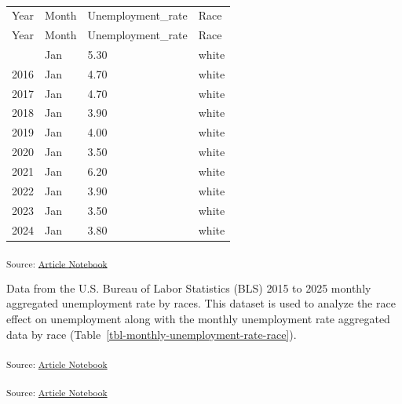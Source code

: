\documentclass[
]{agujournal2019}
\begin{document}
\begin{longtable}[]{@{}llll@{}}

\caption{\label{tbl-monthly-unemployment-rate-race}BLS 2015-2025 Monthly
Unemployment Rate By Race}

\tabularnewline

\caption{}\label{T_c9f29}\tabularnewline
\toprule\noalign{}
Year & Month & Unemployment\_rate & Race \\
\midrule\noalign{}
\endfirsthead
\toprule\noalign{}
Year & Month & Unemployment\_rate & Race \\
\midrule\noalign{}
\endhead
\bottomrule\noalign{}
\endlastfoot
2015 & Jan & 5.30 & white \\
2016 & Jan & 4.70 & white \\
2017 & Jan & 4.70 & white \\
2018 & Jan & 3.90 & white \\
2019 & Jan & 4.00 & white \\
2020 & Jan & 3.50 & white \\
2021 & Jan & 6.20 & white \\
2022 & Jan & 3.90 & white \\
2023 & Jan & 3.50 & white \\
2024 & Jan & 3.80 & white \\

\end{longtable}

\textsubscript{Source:
\href{https://mw1296.github.io/dsan5650_social_causal_inference/index.qmd.html}{Article
Notebook}}

Data from the U.S. Bureau of Labor Statistics (BLS) 2015 to 2025 monthly
aggregated unemployment rate by races. This dataset is used to analyze
the race effect on unemployment along with the monthly unemployment rate
aggregated data by race
(Table~\ref{tbl-monthly-unemployment-rate-race}).

\textsubscript{Source:
\href{https://mw1296.github.io/dsan5650_social_causal_inference/index.qmd.html}{Article
Notebook}}

\textsubscript{Source:
\href{https://mw1296.github.io/dsan5650_social_causal_inference/index.qmd.html}{Article
Notebook}}
\end{document}
